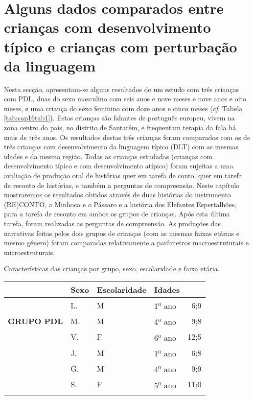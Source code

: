 \documentclass[output=paper,colorlinks,citecolor=brown,booklanguage=portuguese]{langscibook}
\begin{document}
\section{Alguns dados comparados entre crianças com desenvolvimento típico e crianças com perturbação da linguagem}\label{sec:setecap16} Nesta secção, apresentam-se alguns resultados de um estudo com três crianças com PDL, duas do sexo masculino com seis anos e nove meses e nove anos e oito meses, e uma criança do sexo feminino com doze anos e cinco meses (\emph{cf}. Tabela \ref{tab:cap16tab1}). Estas crianças são falantes de português europeu, vivem na zona centro do país, no distrito de Santarém, e frequentam terapia da fala há mais de três anos. Os resultados destas três crianças foram comparados com os de três crianças com desenvolvimento da linguagem típico (DLT) com as mesmas idades e da mesma região. Todas as crianças estudadas (crianças com desenvolvimento típico e com desenvolvimento atípico) foram sujeitas a uma avaliação de produção oral de histórias quer em tarefa de conto, quer em tarefa de reconto de histórias, e também a perguntas de compreensão. Neste capítulo mostraremos os resultados obtidos através de duas histórias do instrumento (RE)CONTO, a Minhoca e o Pássaro e a história dos Elefantes Espertalhões, para a tarefa de reconto em ambos os grupos de crianças. Após esta última tarefa, foram realizadas as perguntas de compreensão. As produções das narrativas feitas pelos dois grupos de crianças (com as mesmas faixas etárias e mesmo género) foram comparadas relativamente a parâmetros macroestruturais e microestruturais.
\begin{Tabela}
    \caption{{Características das crianças por grupo, sexo, escolaridade e faixa etária.}}
    \label{tab:cap16tab1}

    \begin{tabularx}{.8\textwidth}{Xlllr}
    \lsptoprule
 &\textbf{Sexo}& \textbf{Escolaridade} &\textbf{Idades}  \\
 \midrule
  \multirow{3}{*}{\textbf{GRUPO PDL}}&  L.&	M&	1\textsuperscript{o} ano&	6;9\\
  & M.&	M	&4\textsuperscript{o} ano&	9;8\\
&V.&	F	&6\textsuperscript{o} ano&	12;5\\
\tablevspace
\multirow{3}{*}{\textbf{GRUPO DLT}} & J.&	M&	1\textsuperscript{o} ano&	6;8\\
& G.&	M&	4\textsuperscript{o} ano&	9;9\\
&S.&	F	&5\textsuperscript{o} ano&	11;0\\
\lspbottomrule
\end{tabularx}
\end{Tabela}
\end{document}
